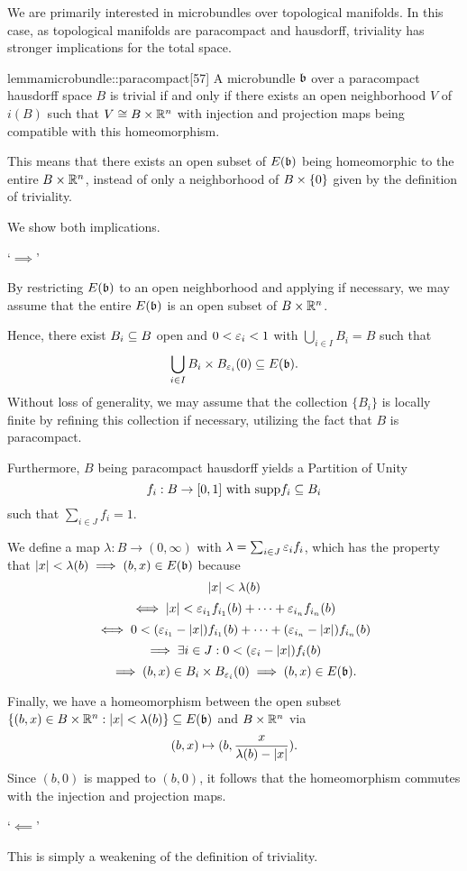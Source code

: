 \begin{myparagraph} We are primarily interested in microbundles over topological manifolds. In this case, as topological manifolds are paracompact and hausdorff, triviality has stronger implications for the total space. \end{myparagraph}

\begin{mystatement}{lemma}{microbundle::paracompact}[57] A microbundle $\bb$ over a paracompact hausdorff space $B$ is trivial if and only if there exists an open neighborhood $V$ of $i(B)$ such that $V \cong B \times \mathbb{R}^n$ with injection and projection maps being compatible with this homeomorphism. \end{mystatement}

\begin{myparagraph} This means that there exists an open subset of $E(\bb)$ being homeomorphic to the entire $B \times \mathbb{R}^n$, instead of only a neighborhood of $B \times{} \{0\}$ given by the definition of triviality. \end{myparagraph}

\begin{myproof} We show both implications.

`$\implies$'

By restricting $E(\bb)$ to an open neighborhood and applying  if necessary, we may assume that the entire $E(\bb)$ is an open subset of $B \times \mathbb{R}^n$.

Hence, there exist $B_i \subseteq{} B$ open and $0 < \varepsilon{}_i < 1$ with $\bigcup_{i \in I} B_i = B$ such that \[ \bigcup_{i \in I } B_i \cross \ball[\eps_i] \sub E(\bb). \] Without loss of generality, we may assume that the collection $\{B_i\}$ is locally finite by refining this collection if necessary, utilizing the fact that $B$ is paracompact.

Furthermore, $B$ being paracompact hausdorff yields a Partition of Unity \[ f_i: B \to [0, 1] \text{ with } \text{supp}{f_i} \subseteq{} B_i\] such that $\sum_{i \in J}f_i = 1$.

We define a map $\lambda: B \to (0, \infty)$ with $\lambda = \sum_{i \in J} \varepsilon{}_i f_i$, which has the property that $\abs{x} < \lambda(b) \implies (b, x) \in E(\bb)$ because \[ \vert{} x \vert{} < \lambda(b) \] \[ \iff \vert{} x \vert{} < \varepsilon{}_{i_1} f_{i_1}(b) + \cdots + \varepsilon{}_{i_n} f_{i_n}(b) \] \[ \iff 0 < (\varepsilon{}_{i_1} - \vert{} x \vert{}) f_{i_1}(b) + \cdots + (\varepsilon{}_{i_n} - \vert{} x \vert{}) f_{i_n}(b) \] \[ \implies \exists i \in J: 0 < (\varepsilon{}_{i} - \vert{} x \vert{}) f_{i}(b) \] \[ \implies (b, x) \in B_i \cross \ball[\eps_i] \implies (b, x) \in E(\bb). \]

Finally, we have a homeomorphism between the open subset $\set{(b, x) \in B \cross \R^n}{\abs{x} < \lambda(b)} \sub E(\bb)$ and $B \times \mathbb{R}^n$ via \[ (b, x) \mapsto (b, \frac{x}{\lambda(b) - \vert{} x \vert{}}). \] Since $(b, 0)$ is mapped to $(b, 0)$, it follows that the homeomorphism commutes with the injection and projection maps.

`$\impliedby$'

This is simply a weakening of the definition of triviality. \end{myproof}